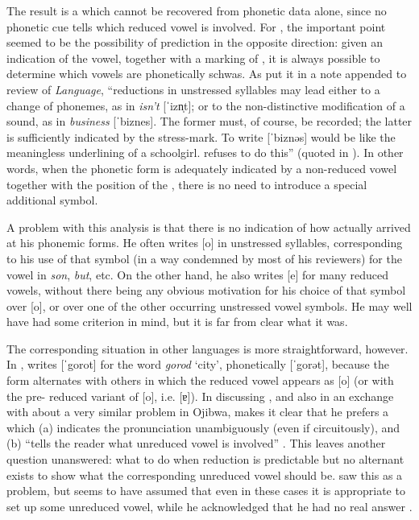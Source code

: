 The result is a  which cannot be recovered from
phonetic data alone, since no phonetic cue tells which reduced vowel
is involved. For {\Bloomfield}, the important point seemed to be the
possibility of prediction in the opposite direction: given an
indication of the vowel, together with a marking of , it is
always possible to determine which vowels are phonetically schwas. As
{\Bolling} put it in a note appended to 
review of \textsl{Language}, ``reductions in unstressed syllables may
lead either to a change of phonemes, as in \emph{isn't} [ˈizn̩t]; or to
the non-distinctive modification of a sound, as in \emph{business}
[ˈbiznes]. The former must, of course, be recorded; the latter is
sufficiently indicated by the stress-mark. To write [ˈbiznəs] would be
like the meaningless underlining of a schoolgirl. {\Bloomfield} refuses
to do this'' (quoted in
\citealt[275]{hockett70:bloomfield.anthology}). In other words, when
the phonetic form is adequately indicated by a non-reduced vowel
together with the position of the , there is no need to
introduce a special additional symbol.

A problem with this analysis is that there is no indication of how
{\Bloomfield} actually arrived at his phonemic forms. He often writes [o]
in unstressed syllables, corresponding to his use of that symbol (in a
way condemned by most of his reviewers) for the vowel in \emph{son},
\emph{but}, etc. On the other hand, he also writes [e] for many
reduced vowels, without there being any obvious motivation for his
choice of that symbol over [o], or over one of the other occurring
unstressed vowel symbols. He may well have had some criterion in mind,
but it is far from clear what it was.

The corresponding situation in other languages is more
straightforward, however. In , {\Bloomfield} writes [ˈgorot] for
the word \emph{gorod} `city', phonetically [ˈgorət], because the form
alternates with others in which the reduced vowel appears as [o] (or
with the pre- reduced variant of [o], i.e. [ɐ]). In discussing
, and also in an exchange with {\Hockett} about a very similar
problem in Ojibwa, {\Bloomfield} makes it clear that he prefers a
 which (a) indicates the pronunciation unambiguously
(even if circuitously), and (b) ``tells the reader what unreduced vowel
is involved'' \citep[375]{hockett70:bloomfield.anthology}. This leaves
another question unanswered: what to do when reduction is predictable
but no alternant exists to show what the corresponding unreduced vowel
should be. {\Bloomfield} saw this as a problem, but seems to have assumed
that even in these cases it is appropriate to set up some unreduced
vowel, while he acknowledged that he had no real
answer \citep[373]{hockett70:bloomfield.anthology}.

